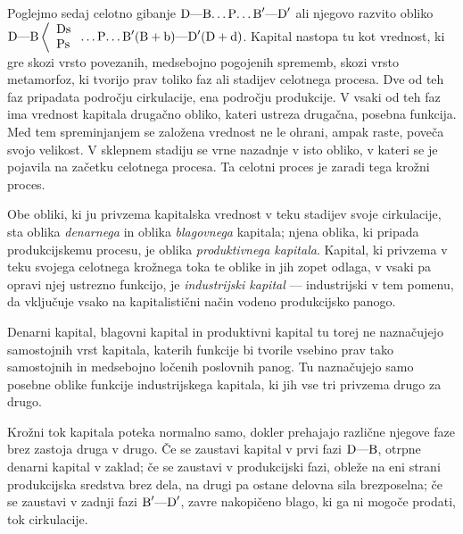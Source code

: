 \documentclass[kapital_02.tex]{subfiles}
\begin{document}
Poglejmo sedaj celotno gibanje \( \textrm{D}\textrm{---}\textrm{B}\textrm{\dots}\textrm{P}\textrm{\dots}\textrm{B}'\textrm{---}\textrm{D}' \) ali njegovo razvito obliko \( 
    \textrm{D}\textrm{---}\textrm{B}\left< 
    \begin{array}{l}
        \textrm{Ds}\\
        \textrm{Ps}\\
    \end{array}
    \right.\textrm{\dots}\textrm{P}\textrm{\dots}\textrm{B}'(\textrm{B} + \textrm{b})\textrm{---}\textrm{D}'(\textrm{D} + \textrm{d})
\). Kapital nastopa tu kot vrednost, ki gre skozi vrsto povezanih, medsebojno pogojenih sprememb, skozi vrsto metamorfoz, ki tvorijo prav toliko faz ali stadijev celotnega procesa. Dve od teh faz pripadata področju cirkulacije, ena področju produkcije. V vsaki od teh faz ima vrednost kapitala drugačno obliko, kateri ustreza drugačna, posebna funkcija. Med tem spreminjanjem se založena vrednost ne le ohrani, ampak raste, poveča svojo velikost. V sklepnem stadiju se vrne nazadnje v isto obliko, v kateri se je pojavila na začetku celotnega procesa. Ta celotni proces je zaradi tega krožni proces.

Obe obliki, ki ju privzema kapitalska vrednost v teku stadijev svoje cirkulacije, sta oblika \emph{denarnega} in oblika \emph{blagovnega} kapitala; njena oblika, ki pripada produkcijskemu procesu, je oblika \emph{produktivnega kapitala}. Kapital, ki privzema v teku svojega celotnega krožnega toka te oblike in jih zopet odlaga, v vsaki pa opravi njej ustrezno funkcijo, je \emph{industrijski kapital} --- industrijski v tem pomenu, da vključuje vsako na kapitalistični način vodeno produkcijsko panogo.

Denarni kapital, blagovni kapital in produktivni kapital tu torej ne naznačujejo samostojnih vrst kapitala, katerih funkcije bi tvorile vsebino prav tako samostojnih in medsebojno ločenih poslovnih panog. Tu naznačujejo samo posebne oblike funkcije industrijskega kapitala, ki jih vse tri privzema drugo za drugo.

Krožni tok kapitala poteka normalno samo, dokler prehajajo različne njegove faze brez zastoja druga v drugo. Če se zaustavi kapital v prvi fazi \( \textrm{D}\textrm{---}\textrm{B} \), otrpne denarni kapital v zaklad; če se zaustavi v produkcijski fazi, obleže na eni strani produkcijska sredstva brez dela, na drugi pa ostane delovna sila brezposelna; če se zaustavi v zadnji fazi \( \textrm{B}'\textrm{---}\textrm{D}' \), zavre nakopičeno blago, ki ga ni mogoče prodati, tok cirkulacije.
\end{document}
